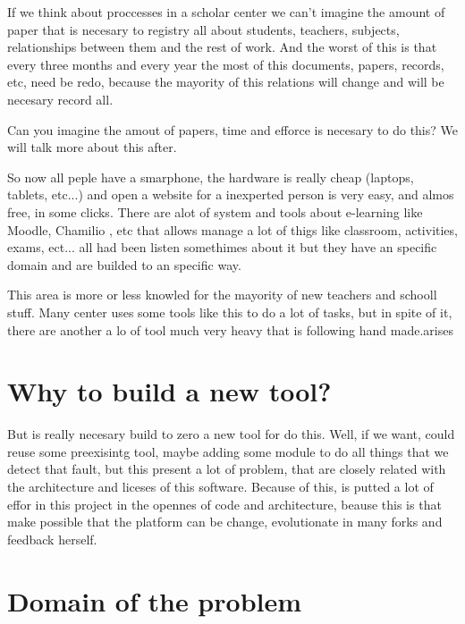 \documentclass[oneside,english,titlepage]{scrbook}
\begin{document}
If we think about proccesses in a scholar center we can't imagine
the amount of paper that is necesary to registry all about students,
teachers, subjects, relationships between them and the rest of work.
And the worst of this is that every three months and every year the
most of this documents, papers, records, etc, need be redo, because
the mayority of this relations will change and will be necesary record
all.

Can you imagine the amout of papers, time and efforce is necesary
to do this? We will talk more about this after.

So now all peple have a smarphone, the hardware is really cheap (laptops,
tablets, etc...) and open a website for a inexperted person is very
easy, and almos free, in some clicks. There are alot of system and
tools about e-learning like Moodle, Chamilio , etc that allows manage
a lot of thigs like classroom, activities, exams, ect... all had been
listen somethimes about it but they have an specific domain and are
builded to an specific way.

This area is more or less knowled for the mayority of new teachers
and schooll stuff. Many center uses some tools like this to do a lot
of tasks, but in spite of it, there are another a lo of tool much
very heavy that is following hand made.arises

\section{Why to build a new tool?}

But is really necesary build to zero a new tool for do this. Well,
if we want, could reuse some preexisintg tool, maybe adding some module
to do all things that we detect that fault, but this present a lot
of problem, that are closely related with the architecture and liceses
of this software. Because of this, is putted a lot of effor in this
project in the opennes of code and architecture, beause this is that
make possible that the platform can be change, evolutionate in many
forks and feedback herself.

\section{Domain of the problem}
\end{document}

